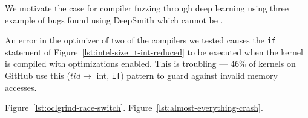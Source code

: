 We motivate the case for compiler fuzzing through deep learning using three example of bugs found using DeepSmith which cannot be .

An error in the optimizer of two of the compilers we tested
causes the \texttt{if} statement of Figure~\ref{lst:intel-size_t-int-reduced} to be executed when the kernel is compiled with optimizations enabled.
This is troubling --- 46\% of kernels on GitHub use this ($tid \rightarrow$ int, \texttt{if}) pattern to guard against invalid memory accesses. 


 Figure~\ref{lst:oclgrind-race-switch}.
 Figure~\ref{lst:almost-everything-crash}.
